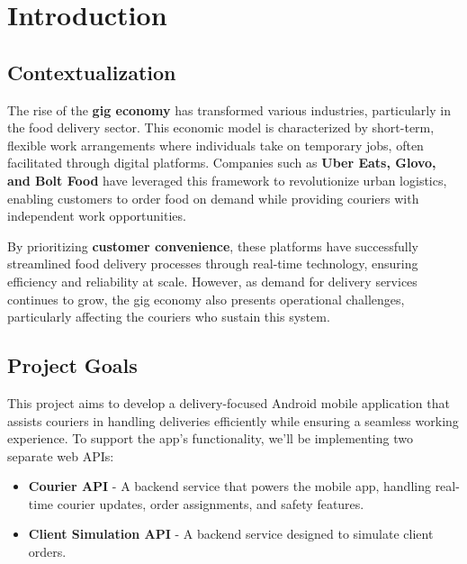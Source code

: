 \documentclass[a4paper,twoside,11pt]{article}
\begin{document}
{\sffamily
\section*{Introduction}

\vspace{5mm}

\subsection*{Contextualization}

\vspace{3mm}

The rise of the \textbf{gig economy} has transformed various industries, particularly in the food delivery sector. This economic model is characterized by short-term, flexible work arrangements where individuals take on temporary jobs, often facilitated through digital platforms. Companies such as \textbf{Uber Eats, Glovo, and Bolt Food} have leveraged this framework to revolutionize urban logistics, enabling customers to order food on demand while providing couriers with independent work opportunities.

\vspace{5mm}

By prioritizing \textbf{customer convenience}, these platforms have successfully streamlined food delivery processes through real-time technology, ensuring efficiency and reliability at scale. However, as demand for delivery services continues to grow, the gig economy also presents operational challenges, particularly affecting the couriers who sustain this system.

\newpage

\subsection*{Project Goals}

This project aims to develop a delivery-focused Android mobile application that assists couriers in handling deliveries efficiently while ensuring a seamless working experience. To support the app’s functionality, we’ll be implementing two separate web APIs:

\begin{itemize}
    \item \textbf{Courier API} - A backend service that powers the mobile app, handling real-time courier updates, order assignments, and safety features.
    \item \textbf{Client Simulation API} - A backend service designed to simulate client orders.
\end{itemize}

}
\end{document}
